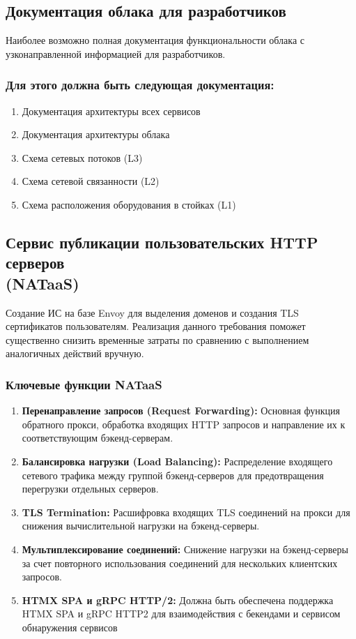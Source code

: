 \documentclass[14pt, a4paper]{extarticle}
\begin{document}
\subsection{Документация облака для разработчиков}

Наиболее возможно полная документация функциональности облака с узконаправленной информацией для разработчиков.

\subsubsection*{Для этого должна быть следующая документация:}

\begin{enumerate}
\item Документация архитектуры всех сервисов
\item Документация архитектуры облака
\item Схема сетевых потоков (L3)
\item Схема сетевой связанности (L2)
\item Схема расположения оборудования в стойках (L1)
\end{enumerate}

\subsection{Сервис публикации пользовательских HTTP серверов \\(NATaaS)}

Создание ИС на базе Envoy для выделения доменов и создания TLS сертификатов пользователям.
Реализация данного требования поможет существенно снизить временные затраты по сравнению с выполнением аналогичных действий вручную.

\subsubsection*{Ключевые функции NATaaS}

\begin{enumerate}
\item \textbf{Перенаправление запросов (Request Forwarding):} Основная функция обратного прокси, обработка входящих HTTP запросов и направление их к соответствующим бэкенд-серверам.
\item \textbf{Балансировка нагрузки (Load Balancing):} Распределение входящего сетевого трафика между группой бэкенд-серверов для предотвращения перегрузки отдельных серверов.
\item \textbf{TLS Termination:} Расшифровка входящих TLS соединений на прокси для снижения вычислительной нагрузки на бэкенд-серверы.
\item \textbf{Мультиплексирование соединений:} Снижение нагрузки на бэкенд-серверы за счет повторного использования соединений для нескольких клиентских запросов.
\item \textbf{HTMX SPA и gRPC HTTP/2:} Должна быть обеспечена поддержка HTMX SPA и gRPC HTTP2 для взаимодействия с бекендами и сервисом обнаружения сервисов
\end{enumerate}
\end{document}
